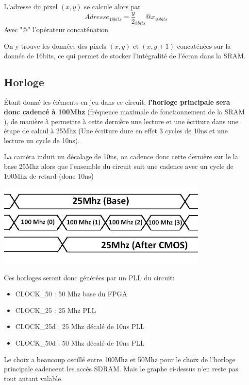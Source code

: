 \documentclass[10pt,a4paper]{report}
\begin{document}
\begin{enumerate}
\begin{itemize}
L'adresse du pixel $\left(x,y\right)$ se calcule alors par
\[ Adresse_{18bits} = \frac{y}{2}_{8bits} @ x_{10bits} \]
Avec "@" l'opérateur concaténation

On y trouve les données des pixels $\left(x,y\right)$ et $\left(x,y+1\right)$ concaténées sur la donnée de 16bits, ce qui permet de stocker l'intégralité de l'écran dans la SRAM.
\end{itemize}
\end{enumerate}

\subsection{Horloge}
Étant donné les éléments en jeu dans ce circuit, \textbf{l'horloge principale sera donc cadencé à 100Mhz} (fréquence maximale de fonctionnement de la SRAM ), de manière à permettre à cette dernière une lecture et une écriture dans une étape de calcul à 25Mhz (Une écriture dure en effet 3 cycles de 10ns et une lecture un cycle de 10ns).

La caméra induit un décalage de 10ns, on cadence donc cette dernière sur le la base 25Mhz alors que l'ensemble du circuit suit une cadence avec un cycle de 100Mhz de retard (donc 10ns)
\begin{center}
\includegraphics[width=300pt]{gfx/clock.png}
\end{center}

Ces horloges seront donc générées par un PLL du circuit:

\begin{itemize}
\item CLOCK\_50 : 50 Mhz base du FPGA
\item CLOCK\_25 : 25 Mhz PLL
\item CLOCK\_25d : 25 Mhz décalé de 10ns PLL 
\item CLOCK\_50d : 50 Mhz décalé de 10ns PLL
\end{itemize}

Le choix a beaucoup oscillé entre 100Mhz et 50Mhz pour le choix de l'horloge principale cadencent les accès SDRAM. Mais le graphe ci-dessus n'en reste pas tout autant valable.
\end{document}
